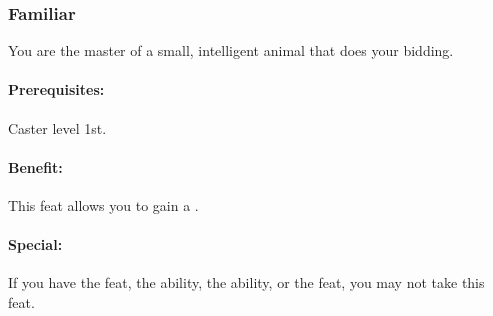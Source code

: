 % 
% 
% 
% 
% 
\subsubsection{Familiar}
\label{Feat:Familiar}
You are the master of a small, intelligent animal that does your bidding.

\paragraph{Prerequisites:} Caster level 1st.

\paragraph{Benefit:} This feat allows you to gain a .

\paragraph{Special:} If you have the  feat, the  ability, the  ability, or the  feat, you may not take this feat.


